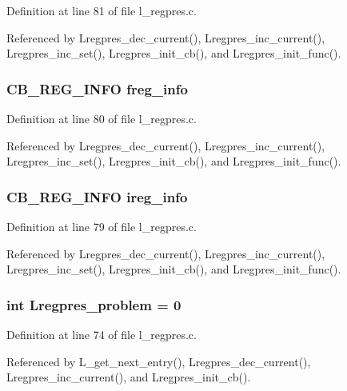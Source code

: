 Definition at line 81 of file l\_\-regpres.c.

Referenced by Lregpres\_\-dec\_\-current(), Lregpres\_\-inc\_\-current(), Lregpres\_\-inc\_\-set(), Lregpres\_\-init\_\-cb(), and Lregpres\_\-init\_\-func().
\subsubsection{\setlength{\rightskip}{0pt plus 5cm}\bf{CB\_\-REG\_\-INFO} \bf{freg\_\-info}}\label{l__regpres_8c_360b283a865b12acd3078199a40caafd}




Definition at line 80 of file l\_\-regpres.c.

Referenced by Lregpres\_\-dec\_\-current(), Lregpres\_\-inc\_\-current(), Lregpres\_\-inc\_\-set(), Lregpres\_\-init\_\-cb(), and Lregpres\_\-init\_\-func().
\subsubsection{\setlength{\rightskip}{0pt plus 5cm}\bf{CB\_\-REG\_\-INFO} \bf{ireg\_\-info}}\label{l__regpres_8c_abc4d42199592ce82fbf255e14709f17}




Definition at line 79 of file l\_\-regpres.c.

Referenced by Lregpres\_\-dec\_\-current(), Lregpres\_\-inc\_\-current(), Lregpres\_\-inc\_\-set(), Lregpres\_\-init\_\-cb(), and Lregpres\_\-init\_\-func().
\subsubsection{\setlength{\rightskip}{0pt plus 5cm}int \bf{Lregpres\_\-problem} = 0}\label{l__regpres_8c_b96327d5a8917f9e25ef7d545d6b61b8}




Definition at line 74 of file l\_\-regpres.c.

Referenced by L\_\-get\_\-next\_\-entry(), Lregpres\_\-dec\_\-current(), Lregpres\_\-inc\_\-current(), and Lregpres\_\-init\_\-cb().
